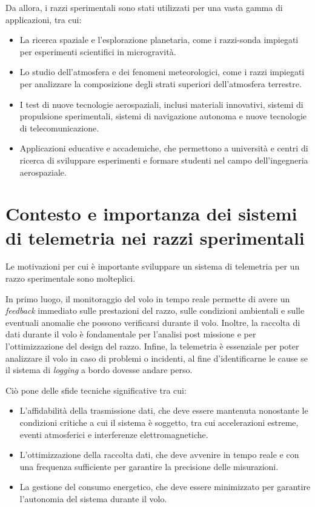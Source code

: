 \documentclass[12pt,a4paper,twoside]{book}
\begin{document}
Da allora, i razzi sperimentali sono stati utilizzati per una vasta gamma di
applicazioni, tra cui:
\begin{itemize}
    \item La ricerca spaziale e l’esplorazione planetaria, come i razzi-sonda
          impiegati per esperimenti scientifici in microgravità.
    \item Lo studio dell’atmosfera e dei fenomeni meteorologici, come i razzi
          impiegati per analizzare la composizione degli strati superiori
          dell’atmosfera terrestre.
    \item I test di nuove tecnologie aerospaziali, inclusi materiali innovativi,
          sistemi di propulsione sperimentali, sistemi di navigazione autonoma e
          nuove tecnologie di telecomunicazione.
    \item Applicazioni educative e accademiche, che permettono a università e
          centri di ricerca di sviluppare esperimenti e formare studenti nel campo
          dell’ingegneria aerospaziale.
\end{itemize}

\section{Contesto e importanza dei sistemi di telemetria nei razzi sperimentali}
Le motivazioni per cui \`e importante sviluppare un sistema di telemetria per un
razzo sperimentale sono molteplici.

In primo luogo, il monitoraggio del volo in tempo reale permette di avere un
\emph{feedback} immediato sulle prestazioni del razzo, sulle condizioni
ambientali e sulle eventuali anomalie che possono verificarsi durante il volo.
Inoltre, la raccolta di dati durante il volo \`e fondamentale per l’analisi
post missione e per l’ottimizzazione del design del razzo.
Infine, la telemetria \`e essenziale per poter analizzare il volo in caso di
problemi o incidenti, al fine d'identificarne le cause se il sistema di
\emph{logging} a bordo dovesse andare perso.

Ciò pone delle sfide tecniche significative tra cui:
\begin{itemize}
    \item L'affidabilità della trasmissione dati, che deve essere mantenuta
          nonostante le condizioni critiche a cui il sistema è soggetto, tra cui
          accelerazioni estreme, eventi atmosferici e interferenze elettromagnetiche.
    \item L'ottimizzazione della raccolta dati, che deve avvenire in tempo reale
          e con una frequenza sufficiente per garantire la precisione delle misurazioni.
    \item La gestione del consumo energetico, che deve essere minimizzato per
          garantire l'autonomia del sistema durante il volo.
\end{itemize}
\end{document}
